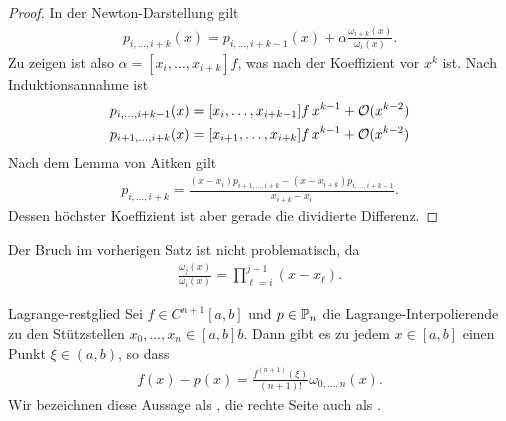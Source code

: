\begin{proof}
  In der Newton-Darstellung gilt
  \begin{gather}
    p_{i,\dots,i+k}(x) = p_{i,\dots,i+k-1}(x)
    + \alpha \frac{\omega_{i+k}(x)}{\omega_i(x)}.
  \end{gather}
  Zu zeigen ist also $\alpha = [x_i,\dots,x_{i+k}]f$, was nach
   der Koeffizient vor $x^k$ ist. Nach
  Induktionsannahme ist
  \begin{gather}
    \begin{split}
      p_{i,\dots,i+k-1}(x) &= [x_i,\dots,x_{i+k-1}]f \,x^{k-1} +\bigo(x^{k-2})\\
      p_{i+1,\dots,i+k}(x) &= [x_{i+1},\dots,x_{i+k}]f \,x^{k-1} +\bigo(x^{k-2})
    \end{split}
  \end{gather}
  Nach dem Lemma von Aitken gilt
  \begin{gather}
    p_{i,\dots,i+k} = \frac{(x-x_i)p_{i+1,\dots,i+k}
      - (x-x_{i+k})p_{i,\dots,i+k-1}}{x_{i+k} - x_i}.
  \end{gather}
  Dessen höchster Koeffizient ist aber gerade die dividierte Differenz.
\end{proof}

\begin{remark}
  Der Bruch im vorherigen Satz ist nicht problematisch, da
  \begin{gather}
    \frac{\omega_j(x)}{\omega_i(x)} = \prod_{\ell=i}^{j-1} (x-x_\ell).
  \end{gather}
\end{remark}

\begin{Satz}{Lagrange-restglied}
  Sei $f \in C^{n+1}[a,b]$ und $p\in \P_n$ die
  Lagrange-Interpolierende zu den Stützstellen
  $x_0,\dots,x_n\in [a,b]b$. Dann gibt es zu jedem $x\in [a,b]$ einen Punkt
  $\xi \in (a,b)$, so dass
  \begin{gather}
    f(x)- p(x) = \frac{f^{(n+1)}(\xi)}{(n+1)!} \omega_{0,\dots,n}(x).
  \end{gather}
  Wir bezeichnen diese Aussage als , die
  rechte Seite auch als .
\end{Satz}

